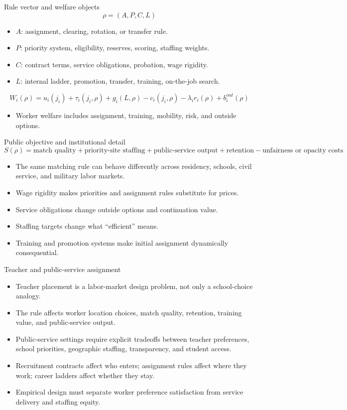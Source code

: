 \documentclass[aspectratio=169,11pt]{beamer}
\begin{document}
\begin{frame}{Rule vector and welfare objects}
\small
\[
  \rho = (A, P, C, L)
\]
\begin{itemize}
    \item $A$: assignment, clearing, rotation, or transfer rule.
    \item $P$: priority system, eligibility, reserves, scoring, staffing weights.
    \item $C$: contract terms, service obligations, probation, wage rigidity.
    \item $L$: internal ladder, promotion, transfer, training, on-the-job search.
\end{itemize}
\[
W_i(\rho)=u_i(j_i)+\tau_i(j_i,\rho)+g_i(L,\rho)
-c_i(j_i,\rho)-\lambda_i r_i(\rho)+b_i^{out}(\rho)
\]
\begin{itemize}
    \item Worker welfare includes assignment, training, mobility, risk, and outside options.
\end{itemize}
\end{frame}

\begin{frame}{Public objective and institutional detail}
\small
\[
  S(\rho)=
  \text{match quality}
  + \text{priority-site staffing}
  + \text{public-service output}
  + \text{retention}
  - \text{unfairness or opacity costs}
\]
\begin{itemize}
    \item The same matching rule can behave differently across residency, schools, civil service, and military labor markets.
    \item Wage rigidity makes priorities and assignment rules substitute for prices.
    \item Service obligations change outside options and continuation value.
    \item Staffing targets change what ``efficient'' means.
    \item Training and promotion systems make initial assignment dynamically consequential.
\end{itemize}
\end{frame}

\begin{frame}{Teacher and public-service assignment}
\begin{itemize}
    \item Teacher placement is a labor-market design problem, not only a school-choice analogy.
    \item The rule affects worker location choices, match quality, retention, training value, and public-service output.
    \item Public-service settings require explicit tradeoffs between teacher preferences, school priorities, geographic staffing, transparency, and student access.
    \item Recruitment contracts affect who enters; assignment rules affect where they work; career ladders affect whether they stay.
    \item Empirical design must separate worker preference satisfaction from service delivery and staffing equity.
\end{itemize}
\end{frame}
\end{document}
